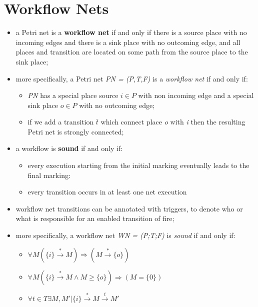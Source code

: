 \documentclass[oneside]{article}
\begin{document}






\section{Workflow Nets}
\begin{itemize}
    \item a Petri net is a \textbf{workflow net} if and only if there is a source place with no incoming edges and there is a sink place with no outcoming edge, and all places and transition are located on some path from the source place to the sink place;
    
    \item more specifically, a Petri net \textit{PN = (P,T,F)} is a \textit{workflow net} if and only if:
        \begin{itemize}
            \item \textit{PN} has a special place source $i \in P$ with non incoming edge and a special sink place $o \in P$ with no outcoming edge;
            \item if we add a transition $\bar t$ which connect place \textit{o} with \textit{i} then the resulting Petri net is strongly connected;
        \end{itemize}
    
    \item a workflow is \textbf{sound} if and only if:
        \begin{itemize}
            \item every execution starting from the initial marking eventually leads to the final marking:
            \item every transition occurs in at least one net execution
        \end{itemize}

    \item workflow net transitions can be annotated with triggers, to denote who or what is responsible for an enabled transition of fire;
    
    \item more specifically, a workflow net \textit{WN = (P;T;F)} is \textit{sound} if and only if:
    \begin{itemize}
        \item $\forall M (\{i\} \overset{*}\longrightarrow M) \Longrightarrow (M \overset{*}\longrightarrow \{o\})$
        \item $\forall M (\{i\} \overset{*}\longrightarrow M \land M \geq \{o\}) \Longrightarrow (M = \{0\})$
        \item $\forall t \in T \exists M, M' | \{i\} \overset{*}\longrightarrow M \overset{t}\longrightarrow M'$
    \end{itemize}
    

\end{itemize}
\end{document}
